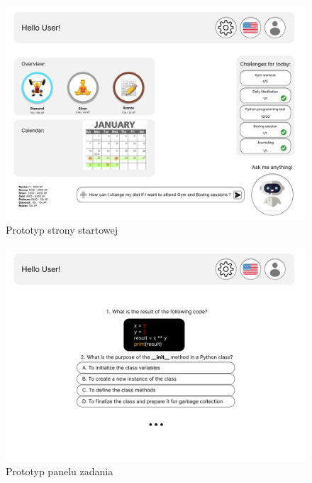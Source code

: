 \begin{figure}[h]
    \centering
    \includegraphics[width=1\textwidth]{Obrazy/prototypy/strona_startowa.png}
    \caption{Prototyp strony startowej}
    \label{fig:my_label}
\end{figure}

\begin{figure}[h]
    \centering
    \includegraphics[width=1\textwidth]{Obrazy/prototypy/panel_zadania.png}
    \caption{Prototyp panelu zadania}
    \label{fig:my_label}
\end{figure}

